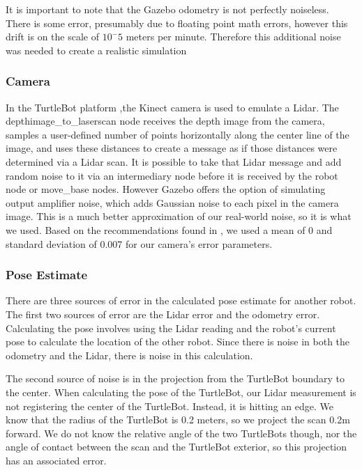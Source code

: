 \documentclass[thesis.tex]{subfile}
\begin{document}
It is important to note that the Gazebo odometry is not perfectly noiseless. There is some error, presumably due to floating point math errors, however this drift is on the scale of $10^-5$ meters per minute. Therefore this additional noise was needed to create a realistic simulation %


\subsubsection{Camera}
In the TurtleBot platform ,the Kinect camera is used to emulate a Lidar. The depthimage\_to\_laserscan node receives the depth image from the camera, samples a user-defined number of points horizontally along the center line of the image, and uses these distances to create a message as if those distances were determined via a Lidar scan. It is possible to take that Lidar message and add random noise to it via an intermediary node before it is received by the robot node or move\_base nodes. However Gazebo offers the option of simulating output amplifier noise, which adds Gaussian noise to each pixel in the camera image. This is a much better approximation of our real-world noise, so it is what we used. Based on the recommendations found in \cite{GazeboSensorNoise}, we used a mean of 0 and standard deviation of 0.007 for our camera's error parameters.

\subsubsection{Pose Estimate}
There are three sources of error in the calculated pose estimate for another robot. The first two sources of error are the Lidar error and the odometry error. Calculating the pose involves using the Lidar reading and the robot's current pose to calculate the location of the other robot. Since there is noise in both the odometry and the Lidar, there is noise in this calculation.

The second source of noise is in the projection from the TurtleBot boundary to the center. When calculating the pose of the TurtleBot, our Lidar measurement is not registering the center of the TurtleBot. Instead, it is hitting an edge. We know that the radius of the TurtleBot is 0.2 meters, so we project the scan 0.2m forward. We do not know the relative angle of the two TurtleBots though, nor the angle of contact between the scan and the TurtleBot exterior, so this projection has an associated error.
\end{document}
